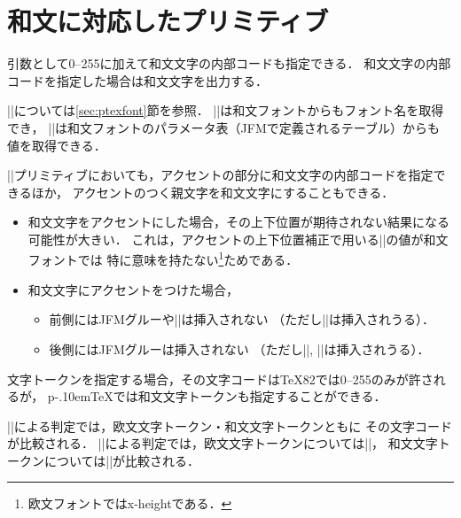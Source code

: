 \documentclass[a4paper,11pt,nomag]{jsarticle}
\def\pTeX{p\kern-.10em\TeX}
\begin{document}
\section{和文に対応したプリミティブ}
\begin{cslist}
 \csitem[\.{char} <character code>,
   \.{chardef} <control sequence>=<character code>]
  引数として0--255に加えて和文文字の内部コードも指定できる．
  和文文字の内部コードを指定した場合は和文文字を出力する．

  |\font|については\ref{sec:ptexfont}節を参照．
  |\fontname|は和文フォントからもフォント名を取得でき，
  |\fontdimen|は和文フォントのパラメータ表（JFMで定義されるテーブル）からも
  値を取得できる．

 \csitem[\.{accent} <character code>=<character>]
  |\accent|プリミティブにおいても，アクセントの部分に和文文字の内部コードを指定できるほか，
  アクセントのつく親文字を和文文字にすることもできる．
 \begin{itemize}
  \item 和文文字をアクセントにした場合，その上下位置が期待されない結果になる
    可能性が大きい．
    これは，アクセントの上下位置補正で用いる||の値が和文フォントでは
    特に意味を持たない\footnote{欧文フォントではx-heightである．}ためである．
  \item 和文文字にアクセントをつけた場合，
    \begin{itemize}
     \item 前側にはJFMグルーや|\kanjiskip|は挿入されない
           （ただし|\xkanjiskip|は挿入されうる）．
     \item 後側にはJFMグルーは挿入されない
           （ただし|\kanjiskip|, |\xkanjiskip|は挿入されうる）．
    \end{itemize}
 \end{itemize}

  文字トークンを指定する場合，その文字コードは\TeX82では0--255のみが許されるが，
  \pTeX では和文文字トークンも指定することができる．

  |\if|による判定では，欧文文字トークン・和文文字トークンともに
  その文字コードが比較される．
  |\ifcat|による判定では，欧文文字トークンについては|\catcode|，
  和文文字トークンについては|\kcatcode|が比較される．
\end{cslist}
\end{document}

